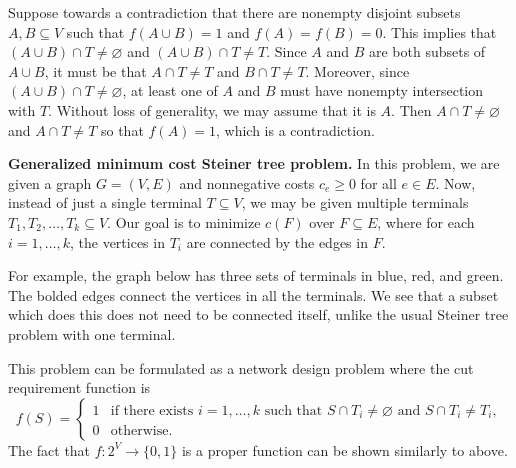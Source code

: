 Suppose towards a contradiction that there are nonempty disjoint subsets $A, B \subseteq V$ 
such that $f(A \cup B) = 1$ and $f(A) = f(B) = 0$. This implies that 
$(A \cup B) \cap T \neq \varnothing$ and $(A \cup B) \cap T \neq T$. 
Since $A$ and $B$ are both subsets of $A \cup B$, it must be that 
$A \cap T \neq T$ and $B \cap T \neq T$. Moreover, since $(A \cup B) 
\cap T \neq \varnothing$, at least one of $A$ and $B$ must have 
nonempty intersection with $T$. Without loss of generality, we may assume 
that it is $A$. Then $A \cap T \neq \varnothing$ and $A \cap T \neq T$
so that $f(A) = 1$, which is a contradiction. 

{\bf Generalized minimum cost Steiner tree problem.} In this problem, 
we are given a graph $G = (V, E)$ and nonnegative costs $c_e \geq 0$ for all 
$e \in E$. Now, instead of just a single terminal $T \subseteq V$, 
we may be given multiple terminals $T_1, T_2, \dots, T_k \subseteq V$. Our 
goal is to minimize $c(F)$ over $F \subseteq E$, where for each $i = 1, \dots, k$, 
the vertices in $T_i$ are connected by the edges in $F$. 

For example, the graph below has three sets of terminals in blue, red, and green.
The bolded edges connect the vertices in all the terminals. We see that a 
subset which does this does not need to be connected itself, unlike the 
usual Steiner tree problem with one terminal.
\begin{center}
\end{center}\vspace{-0.25cm}
This problem can be formulated as a network design problem where the 
cut requirement function is
\[ f(S) = \begin{cases}
    1 & \text{if there exists $i = 1, \dots, k$ such that 
    $S \cap T_i \neq \varnothing$ and $S \cap T_i \neq T_i$}, \\
    0 & \text{otherwise.}
\end{cases} \] 
The fact that $f : 2^V \to \{0, 1\}$ is a proper function can be shown 
similarly to above.

